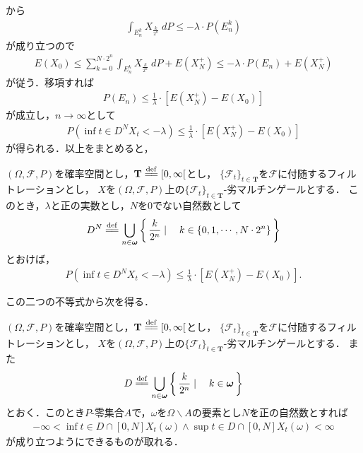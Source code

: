 	から
	\begin{align}
		\int_{E_n^k} X_{\frac{k}{2^n}}\ dP \leq -\lambda \cdot P(E_n^k)
	\end{align}
	が成り立つので
	\begin{align}
		E(X_0) \leq \sum_{k=0}^{N \cdot 2^n} \int_{E_n^k} X_{\frac{k}{2^n}}\ dP + E\left(X_N^+\right)
		\leq -\lambda \cdot P(E_n) + E\left(X_N^+\right)
	\end{align}
	が従う．移項すれば
	\begin{align}
		P\left(E_n\right)
		\leq \frac{1}{\lambda} \cdot \left[E\left(X_N^+\right) - E(X_0)\right]
	\end{align}
	が成立し，$n \longrightarrow \infty$として
	\begin{align}
		P\left(\inf{t \in D^N}{X_t} < -\lambda\right)
		\leq \frac{1}{\lambda} \cdot \left[E\left(X_N^+\right) - E(X_0)\right]
	\end{align}
	が得られる．以上をまとめると，
	
	\begin{screen}
		\begin{thm}[Doobの下限不等式]\label{thm:Doob_inf_bounded_inequality}
			$(\Omega,\mathscr{F},P)$を確率空間とし，$\mathbf{T} \defeq [0,\infty[$とし，
			$\{\mathscr{F}_t\}_{t \in \mathbf{T}}$を$\mathscr{F}$に付随するフィルトレーションとし，
			$X$を$(\Omega,\mathscr{F},P)$上の$\{\mathscr{F}_t\}_{t \in \mathbf{T}}$-劣マルチンゲールとする．
			このとき，$\lambda$と正の実数とし，$N$を$0$でない自然数として
			\begin{align}
				D^N \defeq \bigcup_{n \in \Natural} \Set{\frac{k}{2^n}}{k \in \{0,1,\cdots,N \cdot 2^n\}}
			\end{align}
			とおけば，
			\begin{align}
				P\left(\inf{t \in D^N}{X_t} < -\lambda\right)
				\leq \frac{1}{\lambda} \cdot \left[E\left(X_N^+\right) - E(X_0)\right].
			\end{align}
		\end{thm}
	\end{screen}
	
	この二つの不等式から次を得る．
	
	\begin{screen}
		\begin{thm}[劣マルチンゲールのパスは有界区間上で有界]\label{thm:path_of_submartingale_is_bounded_on_bounded_interval}
			$(\Omega,\mathscr{F},P)$を確率空間とし，$\mathbf{T} \defeq [0,\infty[$とし，
			$\{\mathscr{F}_t\}_{t \in \mathbf{T}}$を$\mathscr{F}$に付随するフィルトレーションとし，
			$X$を$(\Omega,\mathscr{F},P)$上の$\{\mathscr{F}_t\}_{t \in \mathbf{T}}$-劣マルチンゲールとする．
			また
			\begin{align}
				D \defeq \bigcup_{n \in \Natural} \Set{\frac{k}{2^n}}{k \in \Natural}
			\end{align}
			とおく．このとき$P$-零集合$A$で，$\omega$を$\Omega \backslash A$の要素とし$N$を正の自然数とすれば
			\begin{align}
				- \infty < \inf{t \in D \cap [0,N]}X_t(\omega) \wedge \sup{t \in D \cap [0,N]}X_t(\omega) < \infty
			\end{align}
			が成り立つようにできるものが取れる．
		\end{thm}
	\end{screen}
	
